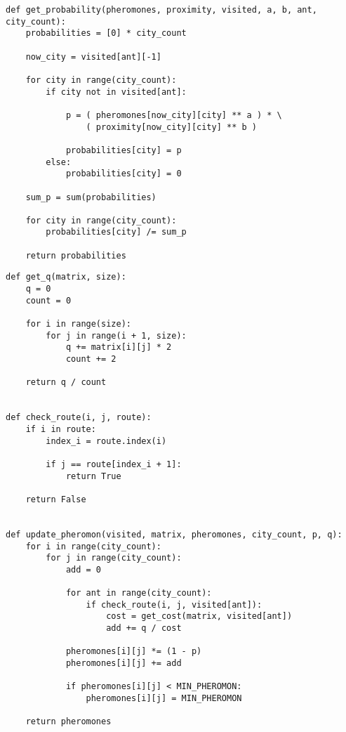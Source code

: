 \begin{center}
\captionsetup{justification=raggedright,singlelinecheck=off}
\begin{lstlisting}[label=lst:prob,caption=Алгоритм нахождения вероятностных переходов]
def get_probability(pheromones, proximity, visited, a, b, ant, city_count):
    probabilities = [0] * city_count

    now_city = visited[ant][-1]

    for city in range(city_count):
        if city not in visited[ant]:

            p = ( pheromones[now_city][city] ** a ) * \
                ( proximity[now_city][city] ** b )
            
            probabilities[city] = p
        else:
            probabilities[city] = 0

    sum_p = sum(probabilities)

    for city in range(city_count):
        probabilities[city] /= sum_p
    
    return probabilities
\end{lstlisting}
\end{center}
\clearpage
\begin{center}
\captionsetup{justification=raggedright,singlelinecheck=off}
\begin{lstlisting}[label=lst:update,caption=Алгоритм обновления феромона на путях]
def get_q(matrix, size):
    q = 0
    count = 0

    for i in range(size):
        for j in range(i + 1, size):
            q += matrix[i][j] * 2
            count += 2

    return q / count


def check_route(i, j, route):
    if i in route:
        index_i = route.index(i)

        if j == route[index_i + 1]:
            return True
    
    return False


def update_pheromon(visited, matrix, pheromones, city_count, p, q):
    for i in range(city_count):
        for j in range(city_count):
            add = 0

            for ant in range(city_count):
                if check_route(i, j, visited[ant]):
                    cost = get_cost(matrix, visited[ant])
                    add += q / cost
            
            pheromones[i][j] *= (1 - p) 
            pheromones[i][j] += add

            if pheromones[i][j] < MIN_PHEROMON:
                pheromones[i][j] = MIN_PHEROMON

    return pheromones
\end{lstlisting}
\end{center}


